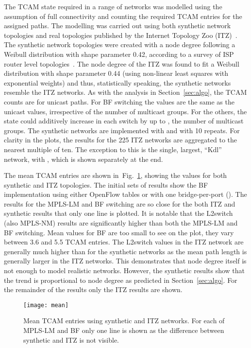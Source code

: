 \documentclass[conference]{IEEEtran}
\newcommand{\figref}[1]{Fig.~\ref{#1}}
\begin{document}
The TCAM state required in a range of networks was modelled using the assumption of full connectivity and counting the required TCAM entries for the assigned paths. The modelling was carried out using both synthetic network topologies and real topologies published by the Internet Topology Zoo (ITZ)~\cite{Knight11}. The synthetic network topologies were created with a node degree following a Weibull distribution with shape parameter 0.42, according to a survey of ISP router level topologies~\cite{Spring02}. The node degree of the ITZ was found to fit a Weibull distribution with shape parameter 0.44 (using non-linear least squares with exponential weights) and thus, statistically speaking, the synthetic networks resemble the ITZ networks. As with the analysis in Section~\ref{sec:algo}, the TCAM counts are for unicast paths.  For BF switching the values are the same as the unicast values, irrespective of the number of multicast groups. For the others, the state could additively increase in each switch by up to , the number of multicast groups. The synthetic networks are implemented with  and with 10 repeats. For clarity in the plots, the results for the 225 ITZ networks are aggregated to the nearest multiple of ten. The exception to this is the single, largest, ``Kdl'' network, with , which is shown separately at the end.

The mean TCAM entries are shown in~\figref{fig:synthMean}, showing the values for both synthetic and ITZ topologies. The initial sets of results show the BF implementation using either OpenFlow tables or with one bridge-per-port (). The results for the MPLS-LM and BF switching are so close for the both ITZ and synthetic results that only one line is plotted. It is notable that the L2switch (also MPLS-NM) results are significantly higher than both the MPLS-LM and BF switching. Mean values for BF are too small to see on the plot, they vary between 3.6 and 5.5 TCAM entries. The L2switch values in the ITZ network are generally much higher than for the synthetic networks as the mean path length is generally larger in the ITZ networks. This demonstrates that node degree itself is not enough to model realistic networks. However, the synthetic results show that the trend is proportional to node degree as predicted in Section~\ref{sec:algo}. For the remainder of the results only the ITZ results are shown.
\begin{figure}[tb]
  \centering
\texttt{[image: mean]}
  \caption{Mean TCAM entries using synthetic and ITZ networks. For
    each of MPLS-LM and BF  only one line is shown as the difference between
    synthetic and ITZ is not visible.}
  \label{fig:synthMean}
\end{figure}
\end{document}
